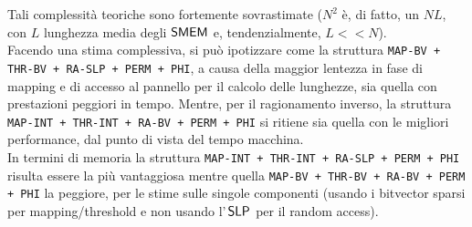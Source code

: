 Tali complessità teoriche sono fortemente sovrastimate ($N^2$ è, di fatto, un
$NL$, con $L$ lunghezza media degli $\mbox{\rm {\sf SMEM}}$ e, tendenzialmente, $L<<N$). \\
Facendo una stima complessiva, si può ipotizzare come la struttura
\texttt{MAP-BV 
+ THR-BV + RA-SLP + PERM + PHI}, a causa della maggior lentezza in fase di
mapping e di accesso al pannello per il calcolo delle lunghezze, sia quella con
prestazioni peggiori in tempo. Mentre, per il ragionamento inverso, la
struttura 
\texttt{MAP-INT + THR-INT + RA-BV + PERM + PHI} si ritiene sia quella con le
migliori performance, dal punto di vista del tempo macchina.\\
In termini di memoria la struttura
\texttt{MAP-INT + THR-INT + RA-SLP + PERM + PHI} risulta essere la più
vantaggiosa mentre quella
\texttt{MAP-BV + THR-BV + RA-BV + PERM + PHI} la peggiore, per le stime sulle
singole componenti (usando i bitvector sparsi per mapping/threshold e non
usando l'$\,\mbox{\rm {\sf SLP}}$ per il random access). 

